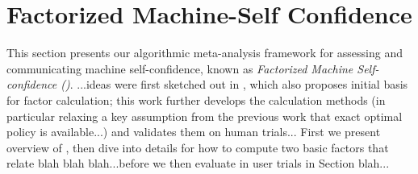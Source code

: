 \section{Factorized Machine-Self Confidence}

This section presents our algorithmic meta-analysis framework for assessing and communicating machine self-confidence, known as \textit{Factorized Machine Self-confidence (\famsec{})}.  ...ideas were first sketched out in \cite{Aitken2016-cv}, which also proposes initial basis for factor calculation; this work further develops the calculation methods (in particular relaxing a key assumption from the previous work that exact optimal policy is available...) and validates them on human trials... First we present overview of \famsec{}, then dive into details for how to compute two basic factors that relate blah blah blah...before we then evaluate in user trials in Section blah...





